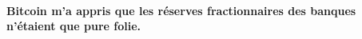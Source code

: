 \paragraph{Bitcoin m'a appris que les réserves fractionnaires des banques
n'étaient que pure folie.}

%
%
%
%
%
